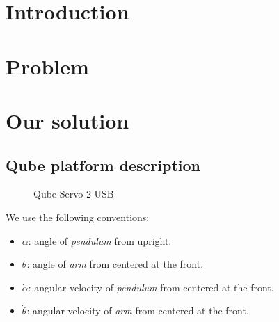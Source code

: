\section{Introduction}
\lipsum[1-4]


\section{Problem}
\lipsum[8-10]


\section{Our solution}
\subsection{Qube platform description}

\begin{figure}%
    \centering
    \qquad
    \caption{Qube Servo-2 USB}
    \label{fig:qube-servo2-usb}
\end{figure}

\lipsum[11]

We use the following conventions:
\begin{itemize}
    \item $\alpha$: angle of \emph{pendulum} from upright.
    \item $\theta$: angle of \emph{arm} from centered at the front.
    \item $\dot{\alpha}$: angular velocity of \emph{pendulum} from centered at the front.
    \item $\dot{\theta}$: angular velocity of \emph{arm} from centered at the front.
\end{itemize}


